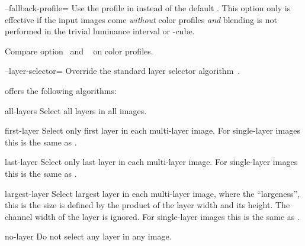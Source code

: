\begin{codelist}
  \label{opt:fallback-profile}%
\item[--fallback-profile=\metavar{PROFILE-FILENAME}]\itemend
  Use the  profile in  instead of the default
  . This option only is effective if the input images come \emph{without} color
  profiles \emph{and} blending is not performed in the trivial luminance interval or
  -cube.

  Compare option~ and
  \chapterName~ on color profiles.


  \label{opt:layer-selector}%
\item[--layer-selector=\metavar{ALGORITHM}]\itemend
  Override the standard layer selector algorithm~.

  \App{} offers the following algorithms:

  \begin{codelist}
  \item[all-layers]\itemend
    Select all layers in all images.

  \item[first-layer]\itemend
    Select only first layer in each multi-layer image.  For single-layer images this is the same
    as .

  \item[last-layer]\itemend
    Select only last layer in each multi-layer image.  For single-layer images this is the same
    as .

  \item[largest-layer]\itemend
    Select largest layer in each multi-layer image, where the ``largeness'', this is the size is
    defined by the product of the layer width and its height.  The channel width of the layer is
    ignored.  For single-layer images this is the same as .

  \item[no-layer]\itemend
    Do not select any layer in any image.


\end{codelist}
\end{codelist}
